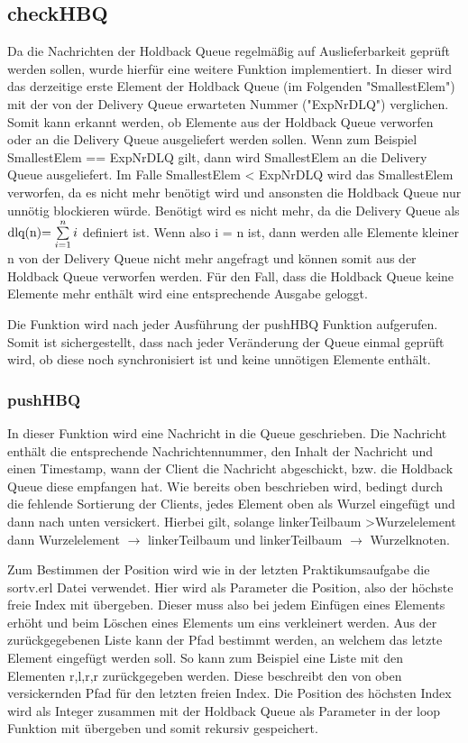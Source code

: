 \subsection{checkHBQ}

Da die Nachrichten der Holdback Queue regelmäßig auf Auslieferbarkeit geprüft werden sollen, wurde hierfür eine weitere Funktion implementiert. 
In dieser wird das derzeitige erste Element der Holdback Queue (im Folgenden "SmallestElem")  mit der von der Delivery Queue erwarteten Nummer ("ExpNrDLQ") verglichen. 
Somit kann erkannt werden, ob Elemente aus der Holdback Queue verworfen oder an die Delivery Queue ausgeliefert werden sollen. 
Wenn zum Beispiel SmallestElem == ExpNrDLQ gilt, dann wird SmallestElem an die Delivery Queue ausgeliefert. Im Falle SmallestElem < ExpNrDLQ wird das SmallestElem verworfen, da es nicht mehr benötigt wird und ansonsten die Holdback Queue nur unnötig blockieren würde. Benötigt wird es nicht mehr, da die Delivery Queue als \( $dlq(n)$ = \sum \limits_{i=1}^n i\)
definiert ist. Wenn also i = n ist, dann werden alle Elemente kleiner n von der Delivery Queue nicht mehr angefragt und können somit aus der Holdback Queue verworfen werden.  
Für den Fall, dass die Holdback Queue keine Elemente mehr enthält wird eine entsprechende Ausgabe geloggt. 

Die Funktion wird nach jeder Ausführung der pushHBQ Funktion aufgerufen. Somit ist sichergestellt, dass nach jeder Veränderung der Queue einmal geprüft wird, ob diese noch synchronisiert ist und keine unnötigen Elemente enthält. 

\subsubsection{pushHBQ} 

In dieser Funktion wird eine Nachricht in die Queue geschrieben. Die Nachricht enthält die entsprechende Nachrichtennummer, den Inhalt der Nachricht und einen Timestamp, wann der Client die Nachricht abgeschickt, bzw. die Holdback Queue diese empfangen hat. Wie bereits oben beschrieben wird, bedingt durch die fehlende Sortierung der Clients, jedes Element oben als Wurzel eingefügt und dann nach unten versickert. Hierbei gilt, solange linkerTeilbaum \textgreater Wurzelelement dann Wurzelelement $\rightarrow$ linkerTeilbaum und linkerTeilbaum $\rightarrow$ Wurzelknoten.
 
Zum Bestimmen der Position wird wie in der letzten Praktikumsaufgabe die sortv.erl Datei verwendet. Hier wird als Parameter die Position, also der höchste freie Index mit übergeben. Dieser muss also bei jedem Einfügen eines Elements erhöht und beim Löschen eines Elements um eins verkleinert werden. 
Aus der zurückgegebenen Liste kann der Pfad bestimmt werden, an welchem das letzte Element eingefügt werden soll. So kann zum Beispiel eine Liste mit den Elementen {r,l,r,r} zurückgegeben werden. Diese beschreibt den von oben versickernden Pfad für den letzten freien Index.
Die Position des höchsten Index wird als Integer zusammen mit der Holdback Queue als Parameter in der loop Funktion mit übergeben und somit rekursiv gespeichert. 


